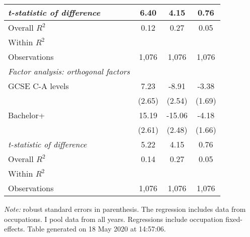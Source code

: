 \begin{center}
\begin{threeparttable}[!h]
\begin{tabular}{lccc}
\textit{t-statistic of difference}&        6.40         &        4.15         &        0.76         \\
\midrule Overall $ R^2$&        0.12         &        0.27         &        0.05         \\
Within $ R^2$       &                     &                     &                     \\
Observations        &       1,076         &       1,076         &       1,076         \\
\midrule \vspace{1mm}\textit{Factor analysis: orthogonal factors} \\ 
\hspace{3mm}GCSE C-A levels&        7.23\sym{**} &       -8.91\sym{***}&       -3.38\sym{*}  \\
                    &      (2.65)         &      (2.54)         &      (1.69)         \\
\hspace{3mm}Bachelor+&       15.19\sym{***}&      -15.06\sym{***}&       -4.18\sym{*}  \\
                    &      (2.61)         &      (2.48)         &      (1.66)         \\
\textit{t-statistic of difference}&        5.22         &        4.15         &        0.76         \\
\midrule Overall $ R^2$&        0.14         &        0.27         &        0.05         \\
Within $ R^2$       &                     &                     &                     \\
Observations        &       1,076         &       1,076         &       1,076         \\
\bottomrule
\bottomrule
\end{tabular}
\begin{tablenotes}
\item \footnotesize \textit{Note:} robust standard errors in parenthesis. The regression includes data from occupations. I pool data from all years. Regressions include occupation fixed-effects. Table generated on 18 May 2020 at 14:57:06.
\end{tablenotes}
\end{threeparttable}
\end{center}
